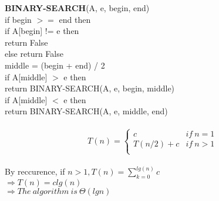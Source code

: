 \documentclass{article}
\begin{document}
\noindent\textbf{BINARY-SEARCH}(A, e, begin, end)\\
\indent if begin $>=$ end then\\
\indent \indent if A[begin] != e then \\
\indent \indent \indent return False\\
\indent \indent else return False\\
\indent middle = (begin + end) / 2\\
\indent if A[middle] $>$ e then \\
\indent \indent \indent return BINARY-SEARCH(A, e, begin, middle)\\
\indent if A[middle] $<$ e then\\
\indent \indent \indent return BINARY-SEARCH(A, e, middle, end)\\\\
\begin{equation}
T(n) =
\begin{cases} c &if \ n = 1\\
  T(n/2)  + c &if \ n > 1\\
\end{cases}
\end{equation}\\
\noindent By reccurence, if $n > 1, T(n) = \sum_{k=0}^{lg(n)}c$\\
$\Rightarrow T(n) = clg(n)$\\
$\Rightarrow The \ algorithm \ is \ \Theta(lgn)$
\end{document}
